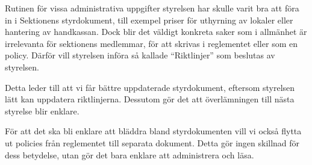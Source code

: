 \documentclass[../_main/handlingar.tex]{subfiles}
\begin{document}

Rutinen för vissa administrativa uppgifter styrelsen har skulle varit bra att föra in i Sektionens styrdokument, till exempel priser för uthyrning av lokaler eller hantering av handkassan. Dock blir det väldigt konkreta saker som i allmänhet är irrelevanta för sektionens medlemmar, för att skrivas i reglementet eller som en policy. Därför vill styrelsen införa så kallade ``Riktlinjer'' som beslutas av styrelsen.

Detta leder till att vi får bättre uppdaterade styrdokument, eftersom styrelsen lätt kan uppdatera riktlinjerna. Dessutom gör det att överlämningen till nästa styrelse blir enklare.

För att det ska bli enklare att bläddra bland styrdokumenten vill vi också flytta ut policies från reglementet till separata dokument. Detta gör ingen skillnad för dess betydelse, utan gör det bara enklare att administrera och läsa.
\end{document}
